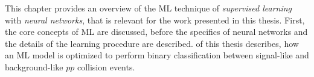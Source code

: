 
This chapter provides an overview of the ML technique of \emph{supervised learning} with \emph{neural networks}, that is relevant for the work presented in this thesis. 
First, the core concepts of ML are discussed, before the specifics of neural networks and the details of the learning procedure are described.
 of this thesis describes, how an ML model is optimized to perform binary classification between signal-like and background-like $pp$ collision events. 



